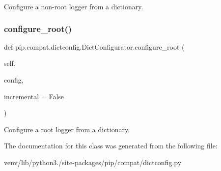 \begin{DoxyVerb}Configure a non-root logger from a dictionary.\end{DoxyVerb}
 \mbox{\label{classpip_1_1compat_1_1dictconfig_1_1_dict_configurator_a85ca9ccfa207fc0327fd3359ea749986}} 
\subsubsection{\texorpdfstring{configure\+\_\+root()}{configure\_root()}}
{\footnotesize\ttfamily def pip.\+compat.\+dictconfig.\+Dict\+Configurator.\+configure\+\_\+root (\begin{DoxyParamCaption}\item[{}]{self,  }\item[{}]{config,  }\item[{}]{incremental = {\ttfamily False} }\end{DoxyParamCaption})}

\begin{DoxyVerb}Configure a root logger from a dictionary.\end{DoxyVerb}
 

The documentation for this class was generated from the following file\+:\begin{DoxyCompactItemize}
\item 
venv/lib/python3./site-\/packages/pip/compat/dictconfig.\+py\end{DoxyCompactItemize}
